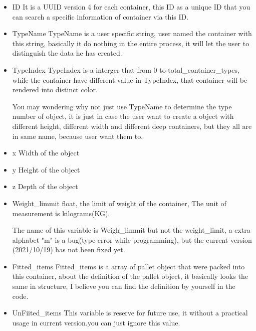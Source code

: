 \documentclass{article}
\begin{document}
\begin{itemize}
\item {ID}
\newline
It is a UUID version 4 for each container, this ID as a unique
ID that you can search a specific information of container via this ID.
\item{TypeName}
\newline
TypeName is a user specific string, user named the container with this string, basically it do nothing in the entire process, it will let the user to distinguish the data he has created.
\item{TypeIndex}
\newline
TypeIndex is a interger that from 0 to total\_container\_types,
while the container have different value in TypeIndex, that container will be rendered into distinct color.
\newline

You may wondering why not just use TypeName to determine the type number of object, it is just in case the user want to create a object with different height, different width and different deep containers, but they all are in same name, because user want them to.
\item{x}
\newline
Width of the object
\item{y}
\newline
Height of the object
\item{z}
\newline
Depth of the object
\item{Weight\_limmit}
float, the limit of weight of the container, The unit of measurement is kilograms(KG).
\newline

The name of this variable is Weigh\_limmit but not the weight\_limit, a extra alphabet "m" is a bug(type error while programming), but the current version (2021/10/19) has not been fixed yet.


\item{Fitted\_items}
\newline
Fitted\_items is a array of pallet object that were packed into this container, about the definition of the pallet object, it basically looks the same in structure, I believe you can find the definition by yourself in the code.

\item{UnFiited\_items}
\newline
This variable is reserve for future use, it without a practical usage in current version.you can just ignore this value.
\end{itemize}
\end{document}
